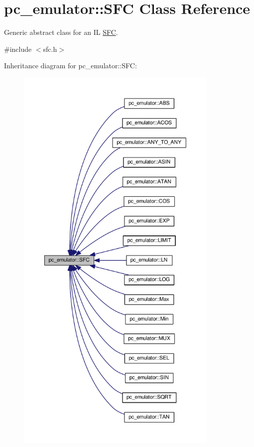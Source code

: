 \hypertarget{classpc__emulator_1_1SFC}{}\section{pc\+\_\+emulator\+:\+:S\+FC Class Reference}
\label{classpc__emulator_1_1SFC}


Generic abstract class for an IL \hyperlink{classpc__emulator_1_1SFC}{S\+FC}.  




{\ttfamily \#include $<$sfc.\+h$>$}



Inheritance diagram for pc\+\_\+emulator\+:\+:S\+FC\+:
\nopagebreak
\begin{figure}[H]
\begin{center}
\leavevmode
\includegraphics[height=550pt]{classpc__emulator_1_1SFC__inherit__graph}
\end{center}
\end{figure}


